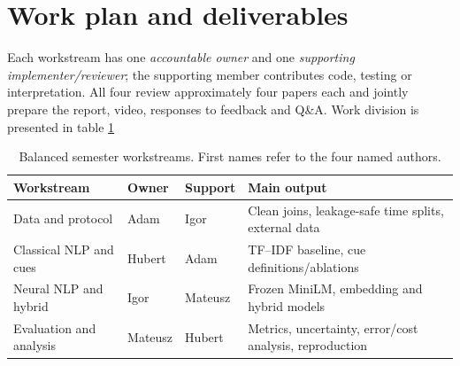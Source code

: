 \documentclass[11pt]{article}
\begin{document}
\section{Work plan and deliverables}
Each workstream has one \emph{accountable owner} and one \emph{supporting implementer/reviewer}; the supporting member contributes code, testing or interpretation. All four review approximately four papers each and jointly prepare the report, video, responses to feedback and Q\&A. Work division is presented in table \ref{tab:roles}

\begin{table}[]
\caption{Balanced semester workstreams. First names refer to the four named authors.}
\label{tab:roles}
\centering\scriptsize
\setlength{\tabcolsep}{3pt}
\begin{tabularx}{\columnwidth}{@{}p{1.85cm}p{1.18cm}p{1.14cm}X@{}}
\toprule
Workstream & Owner & Support & Main output\\
\midrule
Data and protocol & Adam & Igor & Clean joins, leakage-safe time splits, external data\\
Classical NLP and cues & Hubert & Adam & TF--IDF baseline, cue definitions/ablations\\
Neural NLP and hybrid & Igor & Mateusz & Frozen MiniLM, embedding and hybrid models\\
Evaluation and analysis & Mateusz & Hubert & Metrics, uncertainty, error/cost analysis, reproduction\\
\bottomrule
\end{tabularx}
\end{table}
\end{document}
